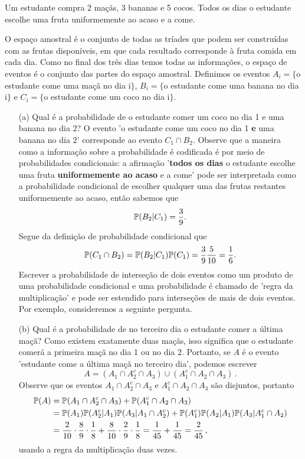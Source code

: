 \begin{example}
\label{ex: total probabilities}
    
Um estudante compra 2 maçãs, 3 bananas e 5 cocos. Todos os dias o estudante escolhe uma fruta uniformemente ao acaso e a come. 

O espaço amostral é o conjunto de todas as tríades que podem ser construídas com as frutas disponíveis, em que cada resultado corresponde à fruta comida em cada dia. Como no final dos três dias temos todas as informações, o espaço de eventos é o conjunto das partes do espaço amostral. Definimos os eventos $A_i=\{$o estudante come uma maçã no dia i$\}$, $B_i=\{$o estudante come uma banana no dia i$\}$ e $C_i=\{$o estudante come um coco no dia i$\}$.

\begin{itemize}
\item[(a)] Qual é a probabilidade de o estudante comer um coco no dia 1 e uma banana no dia 2? O evento 'o estudante come um coco no dia 1 {\bf e} uma banana no dia 2' corresponde ao evento $C_1\cap B_2$. Observe que a maneira como a informação sobre a probabilidade é codificada é por meio de probabilidades condicionais: a afirmação '{\bf todos os dias} o estudante escolhe uma fruta {\bf uniformemente ao acaso} e a come' pode ser interpretada como a probabilidade condicional de escolher qualquer uma das frutas restantes uniformemente ao acaso, então sabemos que
\[ \mathbb{P}(B_2|C_1) = \frac{3}{9}.\]
Segue da definição de probabilidade condicional que 
\[ \mathbb{P}(C_1\cap B_2) = \mathbb{P}(B_2 | C_1) \mathbb{P}(C_1) = \frac{3}{9}\frac{5}{10} = \frac{1}{6}.
\]
Escrever a probabilidade de interseção de dois eventos como um produto de uma probabilidade condicional e uma probabilidade é chamado de 'regra da multiplicação' e pode ser estendido para interseções de mais de dois eventos. Por exemplo, consideremos a seguinte pergunta.
\item[(b)] Qual é a probabilidade de no terceiro dia o estudante comer a última maçã? Como existem exatamente duas maçãs, isso significa que o estudante comerá a primeira maçã no dia 1 ou no dia 2. Portanto, se $A$ é o evento 'estudante come a última maçã no terceiro dia', podemos escrever
\begin{equation}
A= (A_1 \cap A_2^c \cap A_3) \cup (A_1^c \cap A_2 \cap A_3) \,.
\end{equation}
Observe que os eventos $A_1 \cap A_2^c \cap A_3$ e $A_1^c \cap A_2 \cap A_3$ são
disjuntos, portanto 
\begin{align}
\mathbb{P}(A)&= \mathbb{P}(A_1 \cap A_2^c \cap A_3)+ \mathbb{P}(A_1^c \cap A_2 \cap A_3) \\
&=\mathbb{P}(A_1)\mathbb{P}(A_2^c|A_1) \mathbb{P}(A_3|A_1 \cap A_2^c) + \mathbb{P}(A_1^c)\mathbb{P}(A_2|A_1) \mathbb{P}(A_3|A_1^c \cap A_2) \\
&= \frac{2}{10}\cdot \frac{8}{9} \cdot \frac{1}{8}+\frac{8}{10}\cdot \frac{2}{9} \cdot\frac{1}{8} = \frac{1}{45}+\frac{1}{45}=\frac{2}{45} \,,
\end{align}
usando a regra da multiplicação duas vezes.
\end{itemize}
\end{example}

